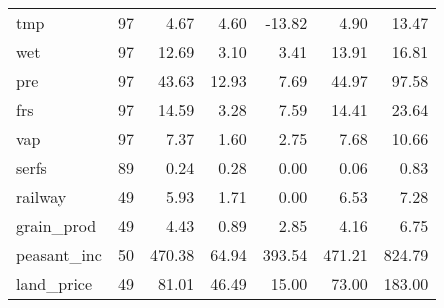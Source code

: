 \begin{longtable}{lrrrrrr}
tmp               &    97 &        4.67 &       4.60 &    -13.82 &        4.90 &       13.47 \\
wet               &    97 &       12.69 &       3.10 &      3.41 &       13.91 &       16.81 \\
pre               &    97 &       43.63 &      12.93 &      7.69 &       44.97 &       97.58 \\
frs               &    97 &       14.59 &       3.28 &      7.59 &       14.41 &       23.64 \\
vap               &    97 &        7.37 &       1.60 &      2.75 &        7.68 &       10.66 \\
serfs             &    89 &        0.24 &       0.28 &      0.00 &        0.06 &        0.83 \\
railway           &    49 &        5.93 &       1.71 &      0.00 &        6.53 &        7.28 \\
grain\_prod        &    49 &        4.43 &       0.89 &      2.85 &        4.16 &        6.75 \\
peasant\_inc       &    50 &      470.38 &      64.94 &    393.54 &      471.21 &      824.79 \\
land\_price        &    49 &       81.01 &      46.49 &     15.00 &       73.00 &      183.00 \\
\end{longtable}
